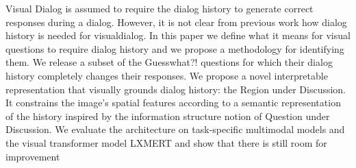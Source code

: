 Visual Dialog is assumed to require the dialog history to generate correct responses during a dialog. However,  it is not clear  from previous work how dialog history is needed for visualdialog. In this paper we define what it means for visual questions to  require dialog history and we propose a methodology for identifying them. We release a subset of the Guesswhat?! questions for which their dialog history completely changes their responses. We propose a novel interpretable representation that visually grounds dialog history: the Region under Discussion. It constrains the image's spatial features according to a semantic representation of the history inspired by the information structure notion of Question  under Discussion. We evaluate the architecture on task-specific multimodal models and the visual transformer model LXMERT and show that there is still room for improvement
